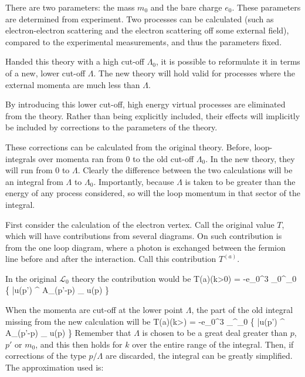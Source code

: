There are two parameters: the mass $m_0$ and the bare charge $e_0$.  These parameters are determined from experiment.  Two processes can be calculated (such as electron-electron scattering and the electron scattering off some external field), compared to the experimental measurements, and thus the parameters fixed.

Handed this theory with a high cut-off $\Lambda_0$, it is possible to reformulate it in terms of a new, lower cut-off $\Lambda$.  The new theory will hold valid for processes where the external momenta are much less than $\Lambda$.	

By introducing this lower cut-off, high energy virtual processes are eliminated from the theory.  Rather than being explicitly included, their effects will implicitly be included by corrections to the parameters of the theory.

These corrections can be calculated from the original theory.  Before, loop-integrals over momenta ran from $0$ to the old cut-off $\Lambda_0$.  In the new theory, they will run from $0$ to $\Lambda$.  Clearly the difference between the two calculations will be an integral from $\Lambda$ to $\Lambda_0$.  Importantly, because $\Lambda$ is taken to be greater than the energy of any process considered, so will the loop momentum in that sector of the integral.

First consider the calculation of the electron vertex.  Call the original value $T$, which will have contributions from several diagrams.  On such contribution is from the one loop diagram, where a photon is exchanged between the fermion line before and after the interaction.  Call this contribution $T^{(a)}$.  

In the original $\mathcal{L}_0$ theory the contribution would be
\beq
	T{(a)}(k>0) = -e_0^3 \int_{0}^{\Lambda_0}   \left\{
		\bar{u}(p') \gamma^\mu {} A_{}(p'-p) \cdot \gamma {} \gamma_\mu
		u(p) \right\}
\eeq  


When the momenta are cut-off at the lower point $\Lambda$, the part of the old integral missing from the new calculation will be
\beq
	T{(a)}(k>\Lambda) = -e_0^3 \int_{\Lambda}^{\Lambda_0}   \left\{
		\bar{u}(p') \gamma^\mu {} A_{}(p'-p) \cdot \gamma {} \gamma_\mu
		u(p) \right\}
\eeq  
Remember that $\Lambda$ is chosen to be a great deal greater than $p$, $p'$ or $m_0$, and this then holds for $k$ over the entire range of the integral.  Then, if corrections of the type $p/\Lambda$ are discarded, the integral can be greatly simplified.  The approximation used is:

